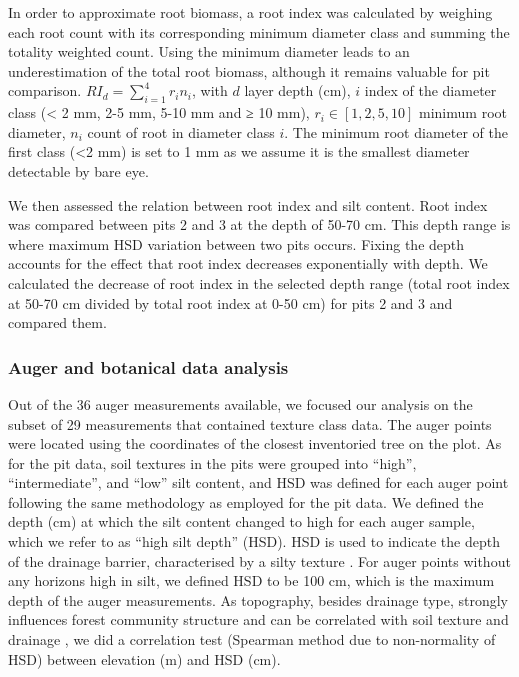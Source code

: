 \documentclass[fleqn,11pt]{latex/stylish_article} %
\begin{document}
In order to approximate root biomass, a root index was calculated by weighing each root count with its corresponding minimum diameter class and summing the totality weighted count. Using the minimum diameter leads to an underestimation of the total root biomass, although it remains valuable for pit comparison.
\(RI_d = \sum_{i=1}^4 r_i n_i\), with \(d\) layer depth (cm), \(i\) index of the diameter class (\textless{} 2 mm, 2-5 mm, 5-10 mm and ≥ 10 mm), \(r_i \in [1, 2, 5, 10]\) minimum root diameter, \(n_i\) count of root in diameter class \(i\). The minimum root diameter of the first class (\textless2 mm) is set to 1 mm as we assume it is the smallest diameter detectable by bare eye.

We then assessed the relation between root index and silt content. Root index was compared between pits 2 and 3 at the depth of 50-70 cm. This depth range is where maximum HSD variation between two pits occurs. Fixing the depth accounts for the effect that root index decreases exponentially with depth. We calculated the decrease of root index in the selected depth range (total root index at 50-70 cm divided by total root index at 0-50 cm) for pits 2 and 3 and compared them.

\hypertarget{auger-and-botanical-data-analysis}{%
\subsubsection{Auger and botanical data analysis}\label{auger-and-botanical-data-analysis}}

Out of the 36 auger measurements available, we focused our analysis on the subset of 29 measurements that contained texture class data. The auger points were located using the coordinates of the closest inventoried tree on the plot. As for the pit data, soil textures in the pits were grouped into \enquote{high}, \enquote{intermediate}, and \enquote{low} silt content, and HSD was defined for each auger point following the same methodology as employed for the pit data. We defined the depth (cm) at which the silt content changed to high for each auger sample, which we refer to as \enquote{high silt depth} (HSD). HSD is used to indicate the depth of the drainage barrier, characterised by a silty texture \citep{ferryGeneseFonctionnementHydrique2003, humbelCaracterisationParMesures1978}. For auger points without any horizons high in silt, we defined HSD to be 100 cm, which is the maximum depth of the auger measurements. As topography, besides drainage type, strongly influences forest community structure \citep{baldeckSoilResourcesTopography2013, ferryHigherTreefallRates2010} and can be correlated with soil texture and drainage \citep{epronSpatialVariationSoil2006}, we did a correlation test (Spearman method due to non-normality of HSD) between elevation (m) and HSD (cm).
\end{document}
